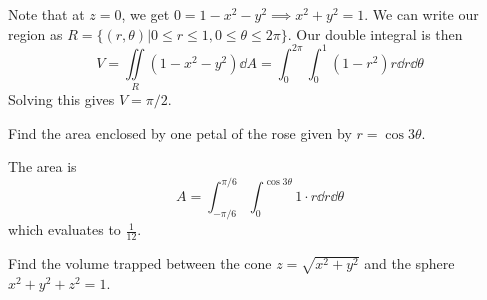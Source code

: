 \begin{itemize}
\begin{example}
        Note that at $z=0$, we get $0=1-x^2-y^2 \implies x^2+y^2=1$. We can write our region as $R=\{(r,\theta)|0\le r\le 1, 0\le \theta \le 2\pi\}$. Our double integral is then 
        \begin{equation}
            V = \iint\limits_{R} (1-x^2-y^2)\dd{A} = \int_{0}^{2\pi}\int_{0}^1 (1-r^2)r\dd{r}\dd{\theta}
        \end{equation}
        Solving this gives $V=\pi/2$.
    \end{example}
    \begin{example}
        Find the area enclosed by one petal of the rose given by $r=\cos3\theta$.
        \begin{center}
            The area is
            \begin{equation}
                A = \int_{-\pi/6}^{\pi/6}\int_0^{\cos3\theta} 1 \cdot r\dd{r}\dd{\theta}
            \end{equation}
            which evaluates to $\frac{1}{12}$.
        \end{center}
    \end{example}
    \begin{example}
        Find the volume trapped between the cone $z=\sqrt{x^2+y^2}$ and the sphere $x^2+y^2+z^2=1$.
        \vspace{2mm}


\end{example}
\end{itemize}
